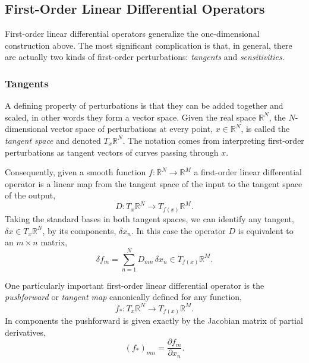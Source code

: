 \subsection{First-Order Linear Differential Operators}

First-order linear differential operators generalize the one-dimensional construction
above.  The most significant complication is that, in general, there are actually two 
kinds of first-order perturbations: \textit{tangents} and \textit{sensitivities}.

\subsubsection{Tangents}

A defining property of perturbations is that they can be added together and scaled,
in other words they form a vector space.  Given the real space $\mathbb{R}^{N}$,
the $N$-dimensional vector space of perturbations at every point, $x \in \mathbb{R}^{N}$, 
is called the \textit{tangent space} and denoted $T_{x} \mathbb{R}^{N}$.  The notation
comes from interpreting first-order perturbations as tangent vectors of curves
passing through $x$.

Consequently, given a smooth function $f : \mathbb{R}^{N} \rightarrow \mathbb{R}^{M}$
a first-order linear differential operator is a linear map from the tangent space of
the input to the tangent space of the output,
%
\begin{equation*}
D : T_{x} \mathbb{R}^{N} \rightarrow T_{ f ( x ) } \mathbb{R}^{M}.
\end{equation*}
%
Taking the standard bases in both tangent spaces, we can identify any tangent,
$\delta x \in T_{x} \mathbb{R}^{N}$, by its components, $\delta x_{n}$.  In this case
the operator $D$ is equivalent to an $m \times n$ matrix,
%
\begin{equation*}
\delta f_{m} = \sum_{n = 1}^{N} D_{mn} \, \delta x_{n} \in T_{f(x)} \mathbb{R}^{M}.
\end{equation*}

One particularly important first-order linear differential operator is the \textit{pushforward}
or \textit{tangent map} canonically defined for any function,
%
\begin{equation*}
f_{*} : T_{x} \mathbb{R}^{N} \rightarrow T_{ f ( x ) } \mathbb{R}^{M}.
\end{equation*}
%
In components the pushforward is given exactly by the Jacobian matrix of partial derivatives,
%
\begin{equation*}
\left( f_{*} \right)_{mn} = \frac{ \partial f_{m} }{ \partial x_{n} }.
\end{equation*}

